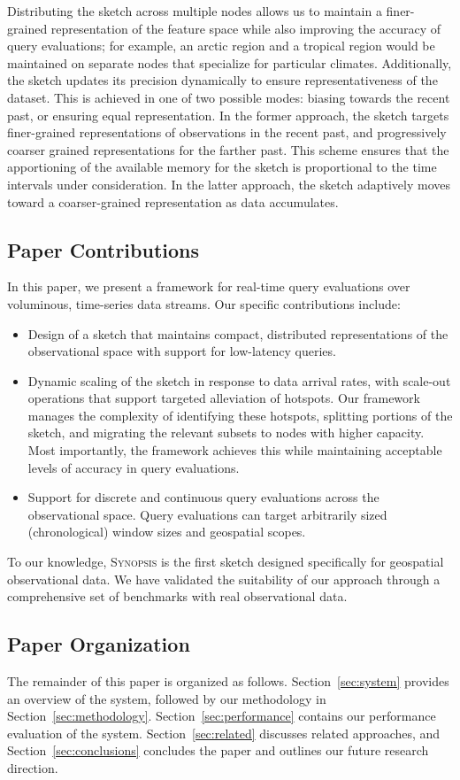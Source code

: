 Distributing the sketch across multiple nodes allows us to maintain a finer-grained representation of the feature space while also improving the accuracy of query evaluations; for example, an arctic region and a tropical region would be maintained on separate nodes that specialize for particular climates. Additionally, the sketch updates its precision dynamically to ensure representativeness of the dataset. This is achieved in one of two possible modes: biasing towards the recent past, or ensuring equal representation. In the former approach, the sketch targets finer-grained representations of observations in the recent past, and progressively coarser grained representations for the farther past. This scheme ensures that the apportioning of the available memory for the sketch is proportional to the time intervals under consideration.  In the latter approach, the sketch adaptively moves toward a coarser-grained representation as data accumulates.

\subsection{Paper Contributions}
In this paper, we present a framework for real-time query evaluations over voluminous, time-series data streams. Our specific contributions include:
\begin{itemize}
\item   Design of a sketch that maintains compact, distributed representations of the observational space with support for low-latency queries.

\item   Dynamic scaling of the sketch in response to data arrival rates, with scale-out operations that support targeted alleviation of hotspots. Our framework manages the complexity of identifying these hotspots, splitting portions of the sketch, and migrating the relevant subsets to nodes with higher capacity. Most importantly, the framework achieves this while maintaining acceptable levels of accuracy in query evaluations.

\item   Support for discrete and continuous query evaluations across the observational space. Query evaluations can target arbitrarily sized (chronological) window sizes and geospatial scopes.
\end{itemize}
To our knowledge, \textsc{Synopsis} is the first sketch designed specifically for geospatial observational data. We have validated the suitability of our approach through a comprehensive set of benchmarks with real observational data. 

\subsection{Paper Organization}
The remainder of this paper is organized as follows. Section~\ref{sec:system} provides an overview of the system, followed by our methodology in Section~\ref{sec:methodology}. Section~\ref{sec:performance} contains our performance evaluation of the system. Section~\ref{sec:related} discusses related approaches, and Section~\ref{sec:conclusions} concludes the paper and outlines our future research direction.


